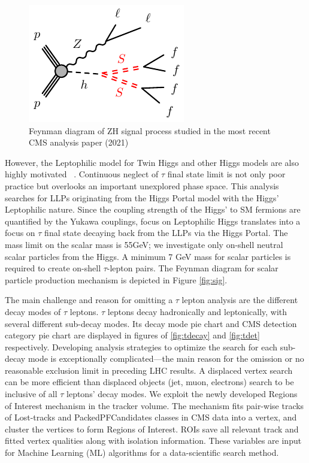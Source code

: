\begin{figure}[h!]
  \caption{Feynman diagram of ZH signal process studied in the most recent CMS analysis paper (2021) \cite{ZHAN}}
  \label{fig:ZHfeyn}
  \centering
  \includegraphics[width=0.47\linewidth]{figs/Zh-llffff-SS.pdf}
\end{figure}


However, the Leptophilic model for Twin Higgs and other Higgs models are also highly motivated ~\cite{Lepto}. Continuous neglect of $\tau$ final state limit is not only poor practice but overlooks an important unexplored phase space.
This analysis searches for LLPs originating from the Higgs Portal model with the Higgs' Leptophilic nature.
Since the coupling strength of the Higgs' to SM fermions are quantified by the Yukawa couplings, focus on Leptophilic Higgs translates into a focus on $\tau$ final state decaying back from the LLPs via the Higgs Portal.
The mass limit on the scalar mass is 55GeV; we investigate only on-shell neutral scalar particles from the Higgs.
A minimum 7 GeV mass for scalar particles is required to create on-shell $\tau$-lepton pairs.
The Feynman diagram for scalar particle production mechanism is depicted in Figure \ref{fig:sig}.


The main challenge and reason for omitting a $\tau$ lepton analysis are the different decay modes of $\tau$ leptons.
$\tau$ leptons decay hadronically and leptonically, with several different sub-decay modes.
Its decay mode pie chart and CMS detection category pie chart are displayed in figures of \ref{fig:tdecay} and \ref{fig:tdet} respectively.
Developing analysis strategies to optimize the search for each sub-decay mode is exceptionally complicated—the main reason for the omission or no reasonable exclusion limit in preceding LHC results.
A displaced vertex search can be more efficient than displaced objects (jet, muon, electrons) search to be inclusive of all $\tau$ leptons' decay modes.
We exploit the newly developed Regions of Interest mechanism in the tracker volume.
The mechanism fits pair-wise tracks of Lost-tracks and PackedPFCandidates classes in CMS data into a vertex, and cluster the vertices to form Regions of Interest. 
ROIs save all relevant track and fitted vertex qualities along with isolation information.
These variables are input for Machine Learning (ML) algorithms for a data-scientific search method.


